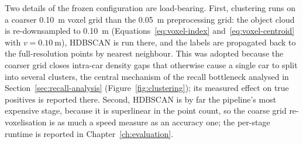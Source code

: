 Two details of the frozen configuration are load-bearing. First, clustering runs
on a coarser \SI{0.10}{\meter} voxel grid than the \SI{0.05}{\meter}
preprocessing grid: the object cloud is re-downsampled to \SI{0.10}{\meter}
(Equations~\eqref{eq:voxel-index} and~\eqref{eq:voxel-centroid} with $v=\SI{0.10}{\meter}$),
HDBSCAN is run there, and the labels are propagated back to the full-resolution
points by nearest neighbour. This was adopted because the coarser
grid closes intra-car density gaps that otherwise cause a single car to split
into several clusters, the central mechanism of the recall bottleneck analysed
in Section~\ref{sec:recall-analysis} (Figure~\ref{fig:clustering}); its measured effect on
true positives is reported there. Second, HDBSCAN is by far the pipeline's most expensive
stage, because it is superlinear in the point count, so the coarse grid re-voxelisation is
as much a speed measure as an accuracy one; the per-stage runtime is reported in
Chapter~\ref{ch:evaluation}.

